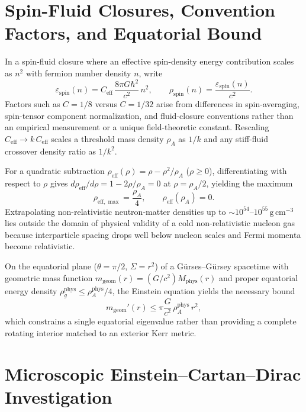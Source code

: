 \documentclass[11pt,a4paper]{article}
\begin{document}
\section{Spin-Fluid Closures, Convention Factors, and Equatorial Bound}
In a spin-fluid closure where an effective spin-density energy contribution scales as $n^2$ with fermion number density $n$, write
\begin{equation}
\varepsilon_{\mathrm{spin}}(n) = C_{\mathrm{eff}}\,\frac{8\pi G\hbar^2}{c^2}\,n^2, \qquad \rho_{\mathrm{spin}}(n) = \frac{\varepsilon_{\mathrm{spin}}(n)}{c^2}.
\end{equation}
Factors such as $C = 1/8$ versus $C = 1/32$ arise from differences in spin-averaging, spin-tensor component normalization, and fluid-closure conventions rather than an empirical measurement or a unique field-theoretic constant. Rescaling $C_{\mathrm{eff}} \to k\,C_{\mathrm{eff}}$ scales a threshold mass density $\rho_A$ as $1/k$ and any stiff-fluid crossover density ratio as $1/k^2$.

For a quadratic subtraction $\rho_{\mathrm{eff}}(\rho) = \rho - \rho^2/\rho_A$ ($\rho \ge 0$), differentiating with respect to $\rho$ gives $d\rho_{\mathrm{eff}}/d\rho = 1 - 2\rho/\rho_A = 0$ at $\rho = \rho_A/2$, yielding the maximum
\begin{equation}
\rho_{\mathrm{eff},\max} = \frac{\rho_A}{4}, \qquad \rho_{\mathrm{eff}}(\rho_A) = 0.
\end{equation}
Extrapolating non-relativistic neutron-matter densities up to $\sim 10^{54}\text{--}10^{55}\,\mathrm{g\,cm^{-3}}$ lies outside the domain of physical validity of a cold non-relativistic nucleon gas because interparticle spacing drops well below nucleon scales and Fermi momenta become relativistic.

On the equatorial plane ($\theta = \pi/2$, $\Sigma = r^2$) of a G\"urses--G\"ursey spacetime with geometric mass function $m_{\mathrm{geom}}(r) = (G/c^2)M_{\mathrm{phys}}(r)$ and proper equatorial energy density $\rho_g^{\mathrm{phys}} \le \rho_A^{\mathrm{phys}}/4$, the Einstein equation yields the necessary bound
\begin{equation}
m_{\mathrm{geom}}'(r) \le \pi\frac{G}{c^2}\,\rho_A^{\mathrm{phys}}\,r^2,
\end{equation}
which constrains a single equatorial eigenvalue rather than providing a complete rotating interior matched to an exterior Kerr metric.

\section{Microscopic Einstein--Cartan--Dirac Investigation}
\end{document}
